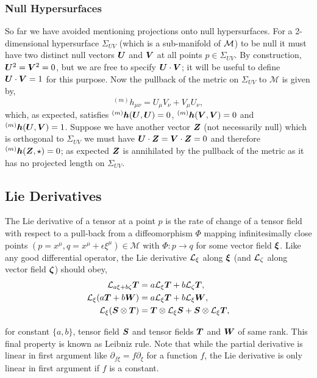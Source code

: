 \subsubsection{Null Hypersurfaces}

So far we have avoided mentioning projections onto null hypersurfaces. For a 2-dimensional
hypersurface $\Sigma_{UV}$ (which is a sub-manifold of $\mathcal{M}$) to be null it must have two distinct null vectors
$\boldsymbol{U}$ and $\boldsymbol{V}$ at all points $p \in \Sigma_{UV}$. By construction, $\boldsymbol{U}^2 = \boldsymbol{V}^2=0$,
but we are free to specify $\boldsymbol{U}\cdot \boldsymbol{V}$; it will be useful to define
$\boldsymbol{U}\cdot \boldsymbol{V} = 1$ for this purpose. Now the pullback of the metric on $\Sigma_{UV}$ to $\mathcal{M}$ is
given by,
\begin{equation}
{}^{(m)}h_{\mu\nu} =  U_\mu V_\nu + V_\mu U_\nu,
\end{equation}
which, as expected, satisfies ${}^{(m)}\boldsymbol{h}(\boldsymbol{U},\boldsymbol{U})=0$, ${}^{(m)}\boldsymbol{h}(\boldsymbol{V},\boldsymbol{V})=0$
and ${}^{(m)}\boldsymbol{h}(\boldsymbol{U},\boldsymbol{V})=1$. Suppose we have another vector $\boldsymbol{Z}$
(not necessarily null)
which is orthogonal to $\Sigma_{UV}$ we must have $\boldsymbol{U}\cdot \boldsymbol{Z} = \boldsymbol{V}\cdot \boldsymbol{Z} =0$
and therefore ${}^{(m)}\boldsymbol{h}(\boldsymbol{Z},\star)=0$; as expected $\boldsymbol{Z}$ is annihilated
by the pullback of the metric as it has no
projected length on $\Sigma_{UV}$.

\subsection{Lie Derivatives}\label{intro:sec:lie_deriv}

The Lie derivative of a tensor at a point $p$ is the rate of change of a tensor field with respect to a pull-back from a diffeomorphism $\Phi$ mapping infinitesimally close points $(p=x^\mu,q= x^\mu+\epsilon \xi^\mu) \in \mathcal{M}$ with $\Phi:p \rightarrow q $ for some vector field $\boldsymbol{\xi}$. Like any good differential operator, the Lie derivative $\mathcal{L}_\xi$ along $\boldsymbol{\xi}$ (and $\mathcal{L}_\zeta$ along vector field $\boldsymbol{\zeta}$) should obey,
\begin{align}
\mathcal{L}_{a \xi + b \zeta}\boldsymbol{T}  &= a \mathcal{L}_\xi\boldsymbol{T}  + b \mathcal{L}_\zeta\boldsymbol{T} ,\\
\mathcal{L}_\xi (a \boldsymbol{T} + b \boldsymbol{W}) & = a \mathcal{L}_\xi \boldsymbol{T} + b \mathcal{L}_\xi \boldsymbol{W} , \\
\mathcal{L}_\xi (\boldsymbol{S} \otimes \boldsymbol{T} ) &= \boldsymbol{T} \otimes \mathcal{L}_\xi \boldsymbol{S} + \boldsymbol{S} \otimes \mathcal{L}_\xi \boldsymbol{T} \label{intro:eq:lie_liebnitz},
\end{align}

for constant $\{a,b\}$, tensor field $\boldsymbol{S}$ and tensor fields $\boldsymbol{T}$ and $\boldsymbol{W}$
of same rank. This final property is known as Leibniz rule. Note that while the partial derivative is linear in first argument like $\partial_{f \xi} = f \partial_\xi$ for a function $f$, the Lie derivative is only linear in first argument if $f$ is a constant.

